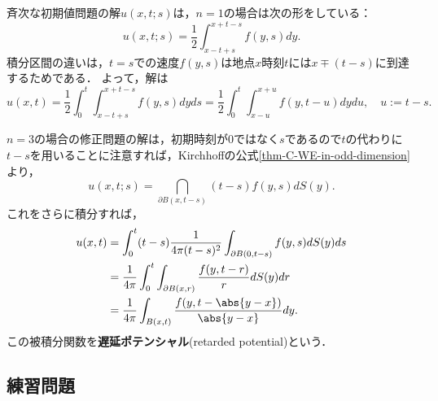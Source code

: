 \documentclass[uplatex,dvipdfmx]{jsreport}
\begin{document}
\begin{example}[$n=1$の場合の解]\label{thm-solution-to-N-C-WE-in-R}
    斉次な初期値問題の解$u(x,t;s)$は，$n=1$の場合は次の形をしている：
    \[u(x,t;s)=\frac{1}{2}\int^{x+t-s}_{x-t+s}f(y,s)dy.\]
    積分区間の違いは，$t=s$での速度$f(y,s)$は地点$x$時刻$t$には$x\mp(t-s)$に到達するためである．
    よって，解は
    \[u(x,t)=\frac{1}{2}\int^t_0\int^{x+t-s}_{x-t+s}f(y,s)dyds=\frac{1}{2}\int^t_0\int^{x+u}_{x-u}f(y,t-u)dydu,\quad u:=t-s.\]
\end{example}

\begin{example}[$n=3$の場合の解]
    $n=3$の場合の修正問題の解は，初期時刻が$0$ではなく$s$であるので$t$の代わりに$t-s$を用いることに注意すれば，Kirchhoffの公式\ref{thm-C-WE-in-odd-dimension}より，
    \[u(x,t;s)=\dint_{\partial B(x,t-s)}(t-s)f(y,s)dS(y).\]
    これをさらに積分すれば，
    \begin{align*}
        u(x,t)&=\int^t_0(t-s)\frac{1}{4\pi(t-s)^2}\int_{\partial B(0,t-s)}f(y,s)dS(y)ds\\
        &=\frac{1}{4\pi}\int^t_0\int_{\partial B(x,r)}\frac{f(y,t-r)}{r}dS(y)dr\\
        &=\frac{1}{4\pi}\int_{B(x,t)}\frac{f(y,t-\abs{y-x})}{\abs{y-x}}dy.
    \end{align*}
    この被積分関数を\textbf{遅延ポテンシャル}(retarded potential)という．
\end{example}

\subsection{練習問題}
\end{document}
